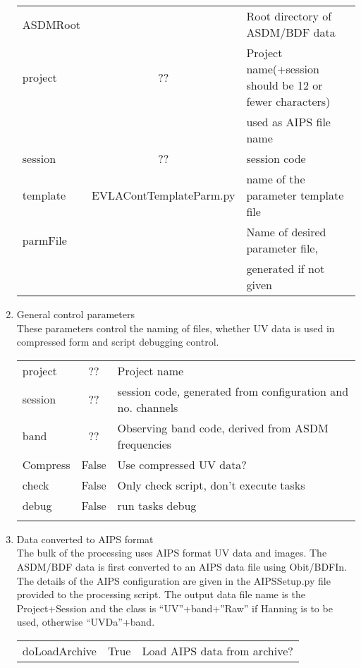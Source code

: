 \documentclass[11pt]{article}
\begin{document}
\begin{enumerate}
\begin{center}
\begin{tabular}{|l|c|l|}
\hline
ASDMRoot & & Root directory of ASDM/BDF data\\
project  & ?? &  Project name(+session should be 12 or fewer characters)\\
& &  used as AIPS file name\\
 session & ?? &  session code\\
template & EVLAContTemplateParm.py & name of the parameter template
file\\
parmFile &  & Name of desired parameter file, \\
 & & generated if not given\\
\hline
\end{tabular}
\end{center}
%
\item General control parameters\\
These parameters control the naming of files, whether UV data is used
in compressed form and script debugging control.
\begin{center}
\begin{tabular}{|l|c|l|}
\hline
 project  & ?? &  Project name\\
 session & ?? &  session code, generated from configuration and no. channels\\
 band  & ?? &  Observing band code, derived from ASDM frequencies\\
 Compress & False &  Use compressed UV data?\\
 check & False &  Only check script, don't execute tasks\\
 debug & False &  run tasks debug\\
  &  &  \\
\hline
\end{tabular}
\end{center}
%
\item Data converted to AIPS format\\
The bulk of the processing uses AIPS format UV data and images.
The ASDM/BDF data is first converted to an AIPS data file using Obit/BDFIn.
The details of the AIPS configuration are given in the AIPSSetup.py
file provided to the processing script.
The output data file name is the Project+Session and the class is
``UV''+band+''Raw'' if Hanning is to be used, otherwise ``UVDa''+band.
\begin{center}
\begin{tabular}{|l|c|l|}
\hline
doLoadArchive  & True & Load AIPS data from archive? \\

\end{tabular}
\end{center}
\end{enumerate}
\end{document}
